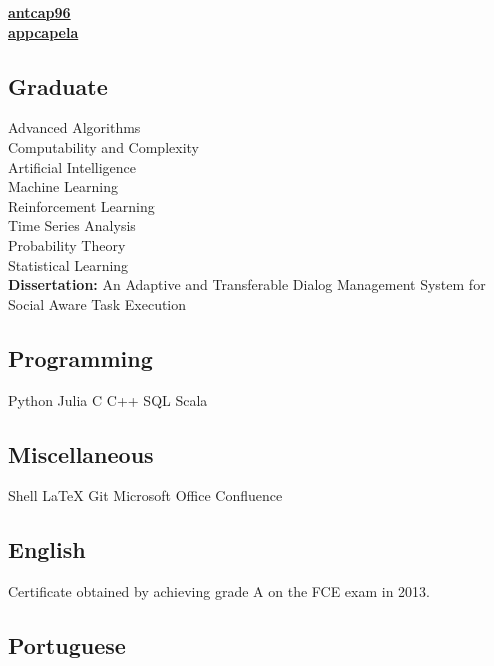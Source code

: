 \documentclass[a4paper]{MagicalCV}
\begin{document}
\begin{minipage}[t]{0.33\textwidth} 


 \href{https://github.com/antcap96}{\bf antcap96} \\
 \href{https://www.linkedin.com/in/appcapela/}{\bf appcapela}
\sectionsep


\subsection{Graduate}
Advanced Algorithms \\
Computability and Complexity \\
Artificial Intelligence \\
Machine Learning \\
Reinforcement Learning \\
Time Series Analysis \\
Probability Theory \\
Statistical Learning \\
\textbf{Dissertation: }
An Adaptive and Transferable Dialog Management System for Social Aware Task Execution \cite{capela2019adaptive}
\sectionsep


\subsection{Programming}
Python \textbullet{}
Julia \textbullet{}
C \textbullet{}
C++ \textbullet{}
SQL \textbullet{}
Scala
\sectionsep
\subsection{Miscellaneous}
Shell \textbullet{}
LaTeX \textbullet{}
Git \textbullet{}
Microsoft Office \textbullet{}
Confluence


\subsection{English}
\vspace{\topsep} %
Certificate obtained by achieving grade A on the FCE exam in 2013.
\sectionsep

\subsection{Portuguese}
\vspace{\topsep} %
\sectionsep


 \\

\end{minipage} 
\end{document}
